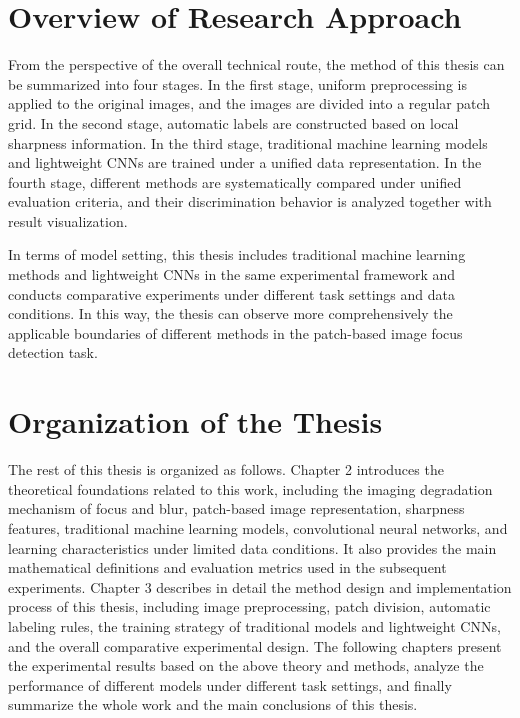 \section{Overview of Research Approach}

\par From the perspective of the overall technical route, the method of this
thesis can be summarized into four stages. In the first stage, uniform
preprocessing is applied to the original images, and the images are divided
into a regular patch grid. In the second stage, automatic labels are
constructed based on local sharpness information. In the third stage,
traditional machine learning models and lightweight CNNs are trained under a
unified data representation. In the fourth stage, different methods are
systematically compared under unified evaluation criteria, and their
discrimination behavior is analyzed together with result visualization.

\par In terms of model setting, this thesis includes traditional machine
learning methods and lightweight CNNs in the same experimental framework and
conducts comparative experiments under different task settings and data
conditions. In this way, the thesis can observe more comprehensively the
applicable boundaries of different methods in the patch-based image focus
detection task.

\section{Organization of the Thesis}

\par The rest of this thesis is organized as follows. Chapter 2 introduces the
theoretical foundations related to this work, including the imaging degradation
mechanism of focus and blur, patch-based image representation, sharpness
features, traditional machine learning models, convolutional neural networks,
and learning characteristics under limited data conditions. It also provides
the main mathematical definitions and evaluation metrics used in the subsequent
experiments. Chapter 3 describes in detail the method design and implementation
process of this thesis, including image preprocessing, patch division,
automatic labeling rules, the training strategy of traditional models and
lightweight CNNs, and the overall comparative experimental design. The
following chapters present the experimental results based on the above theory
and methods, analyze the performance of different models under different task
settings, and finally summarize the whole work and the main conclusions of this
thesis.

